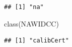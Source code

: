 \documentclass[
]{article}
\newenvironment{Shaded}{\begin{snugshade}}{\end{snugshade}}
\newcommand{\FunctionTok}[1]{\textcolor[rgb]{0.00,0.00,0.00}{#1}}
\newcommand{\NormalTok}[1]{#1}
\newcommand{\SpecialCharTok}[1]{\textcolor[rgb]{0.00,0.00,0.00}{#1}}
\begin{document}
\begin{Shaded}
\end{Shaded}

\begin{verbatim}
## [1] "na"
\end{verbatim}

\begin{Shaded}
\begin{Highlighting}[]
\FunctionTok{class}\NormalTok{(NAWIDCC)}
\end{Highlighting}
\end{Shaded}

\begin{verbatim}
## [1] "calibCert"
\end{verbatim}
\end{document}
